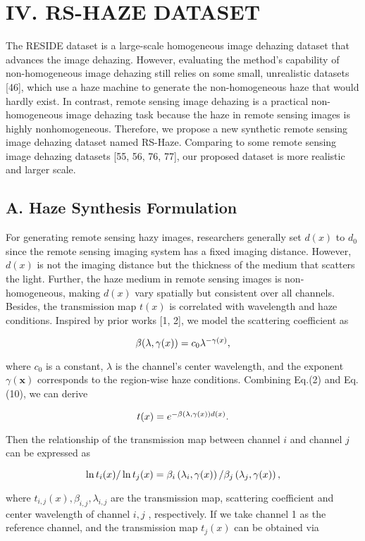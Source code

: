 \documentclass{article}
\begin{document}
\section{IV. RS-HAZE DATASET}


The RESIDE dataset is a large-scale homogeneous image dehazing dataset that advances the image dehazing. However, evaluating the method’s capability of non-homogeneous image dehazing still relies on some small, unrealistic datasets [46], which use a haze machine to generate the non-homogeneous haze that would hardly exist. In contrast, remote sensing image dehazing is a practical non-homogeneous image dehazing task because the haze in remote sensing images is highly nonhomogeneous. Therefore, we propose a new synthetic remote sensing image dehazing dataset named RS-Haze. Comparing to some remote sensing image dehazing datasets [55, 56, 76, 77], our proposed dataset is more realistic and larger scale.


\subsection{A. Haze Synthesis Formulation}


For generating remote sensing hazy images, researchers generally set $d(x)$ to $d_{0}$ since the remote sensing imaging system has a fixed imaging distance. However, $d(x)$ is not the imaging distance but the thickness of the medium that scatters the light. Further, the haze medium in remote sensing images is non-homogeneous, making $d(x)$ vary spatially but consistent over all channels. Besides, the transmission map $t(x)$ is correlated with wavelength and haze conditions. Inspired by prior works [1, 2], we model the scattering coefficient as


\[
$$$$\beta(\lambda,\gamma(x))=c_{0}\lambda^{-\gamma(x)},
\]


where $c_{0}$ is a constant, $\lambda$ is the channel’s center wavelength, and the exponent $\gamma(\boldsymbol{x})$ corresponds to the region-wise haze conditions. Combining Eq.(2) and Eq.(10), we can derive


\[
$$$$t(x)=e^{-\beta(\lambda,\gamma(x))d(x)}.
\]


Then the relationship of the transmission map between channel $i$ and channel $j$ can be expressed as


\[
$$$$\ln t_{i}(x)/\ln t_{j}(x)=\beta_{i}\left(\lambda_{i},\gamma(x)\right)/\beta_{j}\left(\lambda_{j},\gamma(x)\right),
\]


where $t_{{i,j}}(x),\beta_{{i,j}},\lambda_{{i,j}}$ are the transmission map, scattering coefficient and center wavelength of channel ${i,j}$ , respectively. If we take channel 1 as the reference channel, and the transmission map $t_{j}(x)$ can be obtained via
\end{document}
